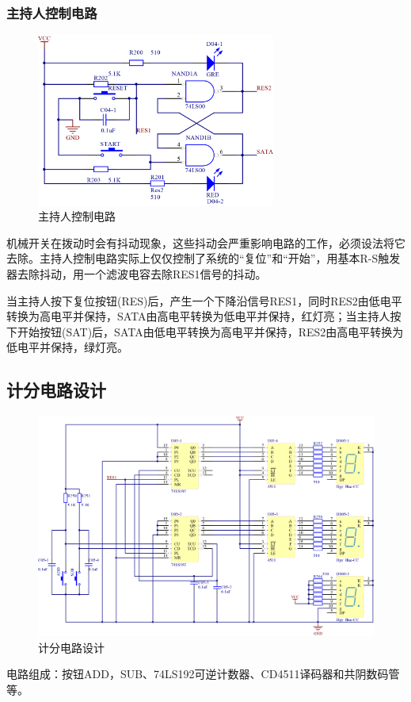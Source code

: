 \documentclass{../source/Experiment}
\begin{document}
            \subsubsection{主持人控制电路}
                \begin{figure}[H]
                    \centering
                    \includegraphics[width = 0.7\textwidth]{pic/P04.png}
                    \caption{主持人控制电路}
                \end{figure}
            机械开关在拨动时会有抖动现象，这些抖动会严重影响电路的工作，必须设法将它去除。主持人控制电路实际上仅仅控制了系统的“复位”和“开始”，用基本R-S触发器去除抖动，用一个滤波电容去除RES1信号的抖动。
            
            当主持人按下复位按钮(RES)后，产生一个下降沿信号RES1，同时RES2由低电平转换为高电平并保持，SATA由高电平转换为低电平并保持，红灯亮；当主持人按下开始按钮(SAT)后，SATA由低电平转换为高电平并保持，RES2由高电平转换为低电平并保持，绿灯亮。
        \subsection{计分电路设计}
            \begin{figure}[H]
                \centering
                \includegraphics[width = 1\textwidth]{pic/P05.png}
                \caption{计分电路设计}
            \end{figure}
        电路组成：按钮ADD，SUB、74LS192可逆计数器、CD4511译码器和共阴数码管等。
\end{document}
